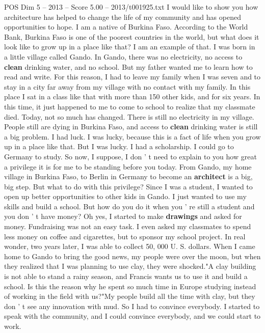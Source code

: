 \begin{textsample}{POS Dim 5 – 2013 – Score 5.00 – 2013/t001925.txt}  \label{ex:f5_pos_042}
I would like to show you how architecture has helped to change the life of my community and has opened opportunities to hope.
I am a native of Burkina Faso.
According to the World Bank, Burkina Faso is one of the poorest countries in the world, but what does it look like to grow up in a place like that?
I am an example of that.
I was born in a little village called Gando.
In Gando, there was no electricity, no access to \textbf{clean} drinking water, and no school.
But my father wanted me to learn how to read and write.
For this reason, I had to leave my family when I was seven and to stay in a city far away from my village with no contact with my family.
In this place I sat in a class like that with more than 150 other kids, and for six years.
In this time, it just happened to me to come to school to realize that my classmate died.
Today, not so much has changed.
There is still no electricity in my village.
People still are dying in Burkina Faso, and access to \textbf{clean} drinking water is still a big problem.
I had luck.
I was lucky, because this is a fact of life when you grow up in a place like that.
But I was lucky.
I had a scholarship.
I could go to Germany to study.
So now, I suppose, I don ' t need to explain to you how great a privilege it is for me to be standing before you today.
From Gando, my home village in Burkina Faso, to Berlin in Germany to become an \textbf{architect} is a big, big step.
But what to do with this privilege?
Since I was a student, I wanted to open up better opportunities to other kids in Gando.
I just wanted to use my skills and build a school.
But how do you do it when you ' re still a student and you don ' t have money?
Oh yes, I started to make \textbf{drawings} and asked for money.
Fundraising was not an easy task.
I even asked my classmates to spend less money on coffee and cigarettes, but to sponsor my school project.
In real wonder, two years later, I was able to collect 50, 000 U.
S. dollars.
When I came home to Gando to bring the good news, my people were over the moon, but when they realized that I was planning to use clay, they were shocked."A clay building is not able to stand a rainy season, and Francis wants us to use it and build a school.
Is this the reason why he spent so much time in Europe studying instead of working in the field with us?"My people build all the time with clay, but they don ' t see any innovation with mud.
So I had to convince everybody.
I started to speak with the community, and I could convince everybody, and we could start to work.

\end{textsample}
